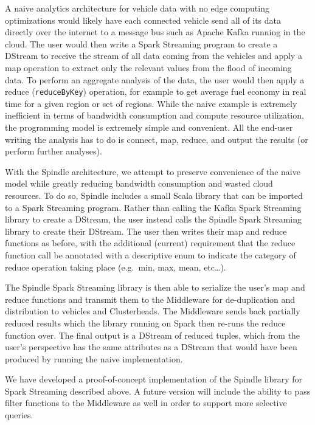 \documentclass{thesis}
\begin{document}
    A naive analytics architecture for vehicle data with no edge computing optimizations
    would likely have each connected vehicle send all of its data directly over the internet to a message bus such as
    Apache Kafka running in the cloud. The user would then write a Spark Streaming program to create a DStream
    to receive the stream of all data coming from the vehicles and apply a map operation to extract only the 
    relevant values from the flood of incoming data. To perform an aggregate analysis of the data, the user would then
    apply a reduce (\verb|reduceByKey|) operation, for example to get average fuel economy in real time for a given region or set of
    regions. While the naive example is extremely inefficient in terms of bandwidth consumption and compute resource
    utilization, the programming model is extremely simple and convenient. All the end-user writing the analysis
    has to do is connect, map, reduce, and output the results (or perform further analyses). 

    With the Spindle architecture, we attempt to preserve convenience of the naive model while greatly reducing
    bandwidth consumption and wasted cloud resources. To do so, Spindle includes a small Scala library that can be
    imported to a Spark Streaming program. Rather than calling the Kafka Spark Streaming library to create a 
    DStream, the user instead calls the Spindle Spark Streaming library to create their DStream. The user then
    writes their map and reduce functions as before, with the additional (current) requirement that the reduce function
    call be annotated with a descriptive enum to indicate the category of reduce operation taking place (e.g.\ min,
    max, mean, etc\dots).%

    The Spindle Spark Streaming library is then able to serialize the user's map and reduce functions and transmit
    them to the Middleware for de-duplication and distribution to vehicles and Clusterheads. The Middleware
    sends back partially reduced results which the library running on Spark then re-runs the reduce function over.
    The final output is a DStream of reduced tuples, which from the user's perspective has the same attributes as 
    a DStream that would have been produced by running the naive implementation.

    We have developed a proof-of-concept implementation of the Spindle library for Spark Streaming described above.
    A future version will include the ability to pass filter functions to the Middleware as well in order to support
    more selective queries.
\end{document}
